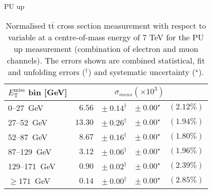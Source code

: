 \documentclass{article}
\newcommand{\ttbar}{\ensuremath{\text{t}\bar{\text{t}}}\xspace}
\newcommand{\GeV}{GeV}
\begin{document}
PU up
\begin{table}[htbp]
\setlength{\tabcolsep}{2pt}
\centering
\caption{Normalised \ttbar cross section measurement with respect to \MET variable
at a centre-of-mass energy of 7 TeV for the PU up measurement (combination of electron and muon
channels). The errors shown are combined statistical, fit and unfolding errors ($^\dagger$) and systematic uncertainty ($^\star$).}
\label{tab:MET_xsections_7TeV_PU_up_combined}
\begin{tabular}{lrrrr}
\hline
$E_{\mathrm{T}}^{\mathrm{miss}}$ bin [\GeV] & \multicolumn{4}{c}{$\sigma_{meas} \left(\times 10^{3}\right)$}\\ 
\hline
0--27~\GeV &  $6.56$ & $ \pm~ 0.14^\dagger$ & $ \pm~ 0.00^\star$ & $(2.12\%)$\\ 
27--52~\GeV &  $13.30$ & $ \pm~ 0.26^\dagger$ & $ \pm~ 0.00^\star$ & $(1.94\%)$\\ 
52--87~\GeV &  $8.67$ & $ \pm~ 0.16^\dagger$ & $ \pm~ 0.00^\star$ & $(1.80\%)$\\ 
87--129~\GeV &  $3.12$ & $ \pm~ 0.06^\dagger$ & $ \pm~ 0.00^\star$ & $(1.96\%)$\\ 
129--171~\GeV &  $0.90$ & $ \pm~ 0.02^\dagger$ & $ \pm~ 0.00^\star$ & $(2.39\%)$\\ 
$\geq 171$~\GeV &  $0.14$ & $ \pm~ 0.00^\dagger$ & $ \pm~ 0.00^\star$ & $(2.85\%)$\\ 
\hline 
\end{tabular}
\end{table}
\end{document}
